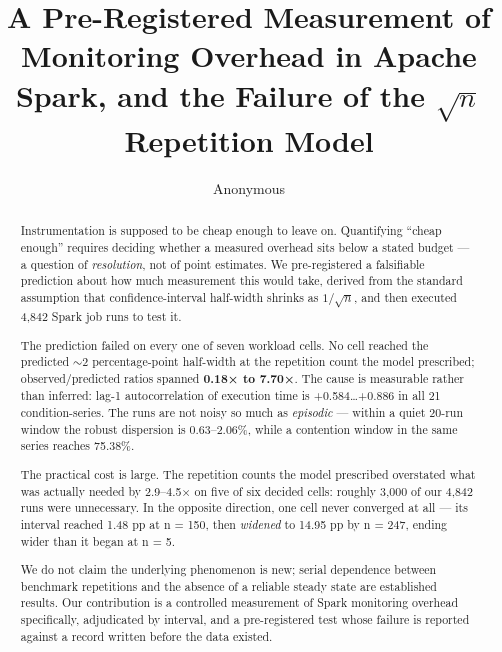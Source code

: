\documentclass[sigconf,review,anonymous]{acmart}
\begin{document}
\title{A Pre-Registered Measurement of Monitoring Overhead in Apache Spark, and the Failure of the \texorpdfstring{$\sqrt{n}$}{sqrt(n)} Repetition Model}

\author{Anonymous}

\begin{abstract}
Instrumentation is supposed to be cheap enough to leave on. Quantifying ``cheap enough'' requires
deciding whether a measured overhead sits below a stated budget --- a question of \emph{resolution},
not of point estimates. We pre-registered a falsifiable prediction about how much measurement
this would take, derived from the standard assumption that confidence-interval half-width
shrinks as $1/\sqrt{n}$, and then executed 4,842 Spark job runs to test it.

The prediction failed on every one of seven workload cells. No cell reached the predicted ${\sim}2$
percentage-point half-width at the repetition count the model prescribed; observed/predicted
ratios spanned \textbf{0.18× to 7.70×}. The cause is
measurable rather than inferred: lag-1 autocorrelation of execution time is +0.584\ldots+0.886 in all
21 condition-series. The runs are not noisy so much as \emph{episodic} --- within a quiet 20-run window
the robust dispersion is 0.63--2.06\%, while a contention window in the same series reaches 75.38\%.

The practical cost is large. The repetition counts the model prescribed overstated what was
actually needed by 2.9--4.5× on five of six decided cells: roughly 3,000 of our 4,842 runs were
unnecessary. In the opposite direction, one cell never converged at all --- its interval reached
1.48 pp at n = 150, then \emph{widened} to 14.95 pp by n = 247, ending wider than it began at n = 5.

We do not claim the underlying phenomenon is new; serial dependence between benchmark
repetitions and the absence of a reliable steady state are established results. Our contribution
is a controlled measurement of Spark monitoring overhead specifically, adjudicated by interval, and
a pre-registered test whose failure is reported against a record written before the data existed.
\end{abstract}

\begin{CCSXML}
\end{CCSXML}
\end{document}
